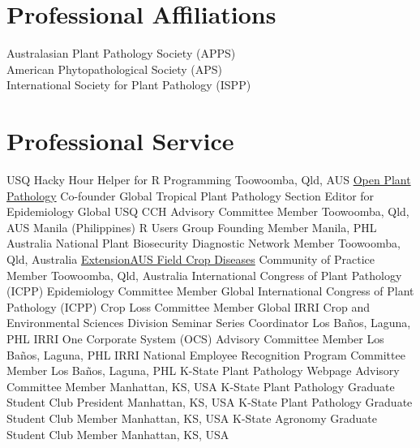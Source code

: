 
\section*{Professional Affiliations}
  Australasian Plant Pathology Society (APPS)\\[3 mm]
  American Phytopathological Society (APS)\\[3 mm]
  International Society for Plant Pathology (ISPP)\\

\section*{Professional Service}
\begin{entrylist}
    {USQ Hacky Hour}
    {Helper for R Programming}
    {Toowoomba, Qld, AUS}
    {\href{https://www.openplantpathology.org}{Open Plant Pathology}}
    {Co-founder}
    {Global}
    {Tropical Plant Pathology}
    {Section Editor for Epidemiology}
    {Global}
    {USQ CCH Advisory Committee}
    {Member}
    {Toowoomba, Qld, AUS}
    {Manila (Philippines) R Users Group}
    {Founding Member}
    {Manila, PHL}
    {Australia National Plant Biosecurity Diagnostic Network}
    {Member}
    {Toowoomba, Qld, Australia}
    {\href{http://extensionaus.com.au/field-crop-diseases/}{ExtensionAUS Field Crop Diseases} Community of Practice}
    {Member}
    {Toowoomba, Qld, Australia}
    {International Congress of Plant Pathology (ICPP) Epidemiology Committee}
    {Member}
    {Global}
    {International Congress of Plant Pathology (ICPP) Crop Loss Committee}
    {Member}
    {Global}
    {IRRI Crop and Environmental Sciences Division Seminar Series}
    {Coordinator}
    {Los Ba\~nos, Laguna, PHL}
    {IRRI One Corporate System (OCS) Advisory Committee}
    {Member}
    {Los Ba\~nos, Laguna, PHL}
    {IRRI National Employee Recognition Program Committee}
    {Member}
    {Los Ba\~nos, Laguna, PHL}
    {K-State Plant Pathology Webpage Advisory Committee}
    {Member}
    {Manhattan, KS, USA}
    {K-State Plant Pathology Graduate Student Club}
    {President}
    {Manhattan, KS, USA}
    {K-State Plant Pathology Graduate Student Club}
    {Member}
    {Manhattan, KS, USA}
    {K-State Agronomy Graduate Student Club}
    {Member}
    {Manhattan, KS, USA}
\end{entrylist}
